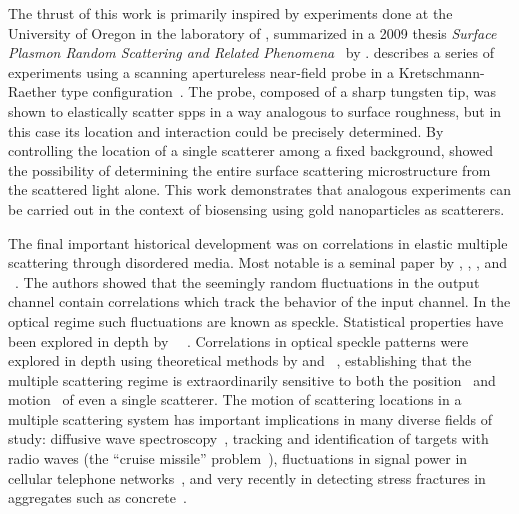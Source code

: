 The thrust of this work is primarily inspired by experiments done at the
University of Oregon in the laboratory of , summarized in a 2009
thesis \textit{Surface Plasmon Random Scattering and Related
Phenomena}~\cite{schumann2009surface} by .  
describes a series of experiments using a scanning apertureless near-field
probe in a Kretschmann-Raether type configuration~\cite{kim1995scanning}.  The
probe, composed of a sharp tungsten tip, was shown to elastically scatter \glspl{spp}
in a way analogous to surface roughness, but in this case its location and
interaction could be precisely determined.  By controlling the location of
a single scatterer among a fixed background,  showed the
possibility of determining the entire surface scattering microstructure from
the scattered light alone.  This work demonstrates that analogous experiments
can be carried out in the context of biosensing using gold nanoparticles as
scatterers.

The final important historical development was on correlations in elastic
multiple scattering through disordered media.  Most notable is a seminal paper
by , , , and
~\cite{feng1988correlations}.  The authors showed that the
seemingly random fluctuations in the output channel contain correlations which
track the behavior of the input channel.  In the optical regime such
fluctuations are known as speckle.  Statistical properties have been explored
in depth by
~\cite{goodman2007speckle}~\cite{goodman1975statistical}.
Correlations in optical speckle patterns were explored in depth using
theoretical methods by  and
~\cite{berkovits1994correlations}, establishing that the multiple
scattering regime is extraordinarily sensitive to both the
position~\cite{berkovits1990theory} and motion~\cite{berkovits1991sensitivity}
of even a single scatterer.  The motion of scattering locations in a multiple
scattering system has important implications in many diverse fields of study:
diffusive wave spectroscopy~\cite{pine1988diffusing}, tracking and
identification of targets with radio waves (the ``cruise missile''
problem~\cite{atkins1991neural}), fluctuations in signal power in cellular
telephone networks~\cite{abdi2001estimation}, and very recently in detecting
stress fractures in aggregates such as concrete~\cite{larose2010locating}.
